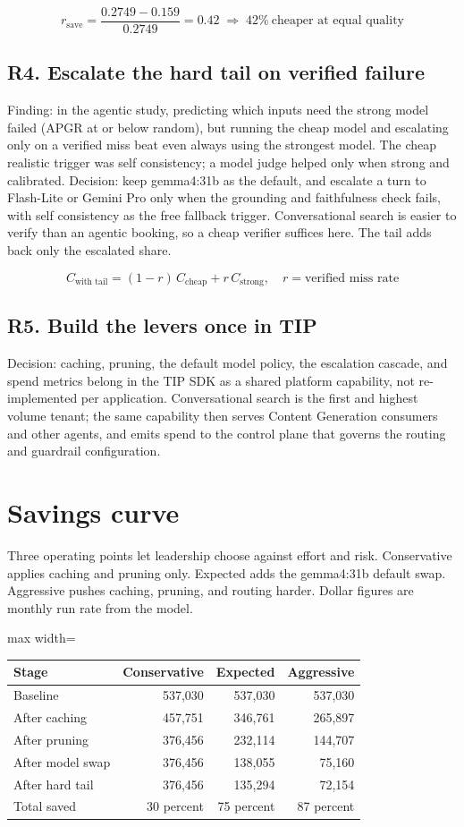 \documentclass[11pt]{uce-report}
\begin{document}
\[r_{\text{save}} = \frac{0.2749 - 0.159}{0.2749} = 0.42 \;\Rightarrow\; 42\%\ \text{cheaper at equal quality}\]
\subsection{R4. Escalate the hard tail on verified failure}
Finding: in the agentic study, predicting which inputs need the strong model failed (APGR at or below random), but running the cheap model and escalating only on a verified miss beat even always using the strongest model. The cheap realistic trigger was self consistency; a model judge helped only when strong and calibrated. Decision: keep gemma4:31b as the default, and escalate a turn to Flash-Lite or Gemini Pro only when the grounding and faithfulness check fails, with self consistency as the free fallback trigger. Conversational search is easier to verify than an agentic booking, so a cheap verifier suffices here. The tail adds back only the escalated share.


\[C_{\text{with tail}} = (1 - r)\,C_{\text{cheap}} + r\,C_{\text{strong}}, \quad r = \text{verified miss rate}\]
\subsection{R5. Build the levers once in TIP}
Decision: caching, pruning, the default model policy, the escalation cascade, and spend metrics belong in the TIP SDK as a shared platform capability, not re-implemented per application. Conversational search is the first and highest volume tenant; the same capability then serves Content Generation consumers and other agents, and emits spend to the control plane that governs the routing and guardrail configuration.


\section{Savings curve}
Three operating points let leadership choose against effort and risk. Conservative applies caching and pruning only. Expected adds the gemma4:31b default swap. Aggressive pushes caching, pruning, and routing harder. Dollar figures are monthly run rate from the model.


\vspace{0.4em}
\noindent\begin{adjustbox}{max width=\linewidth}\begin{tabular}{lrrr}
\toprule
\textbf{Stage} & \textbf{Conservative} & \textbf{Expected} & \textbf{Aggressive} \\
\midrule
Baseline & 537,030 & 537,030 & 537,030 \\
After caching & 457,751 & 346,761 & 265,897 \\
After pruning & 376,456 & 232,114 & 144,707 \\
After model swap & 376,456 & 138,055 & 75,160 \\
After hard tail & 376,456 & 135,294 & 72,154 \\
Total saved & 30 percent & 75 percent & 87 percent \\
\bottomrule
\end{tabular}\end{adjustbox}
\end{document}
